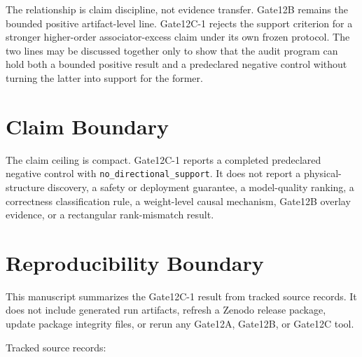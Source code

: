 \documentclass[11pt]{article}
\newcommand{\breakcode}[1]{\begingroup\urlstyle{tt}\nolinkurl{#1}\endgroup}
\begin{document}
The relationship is claim discipline, not evidence transfer. Gate12B remains
the bounded positive artifact-level line. Gate12C-1 rejects the support
criterion for a stronger higher-order associator-excess claim under its own
frozen protocol. The two lines may be discussed together only to show that the
audit program can hold both a bounded positive result and a predeclared
negative control without turning the latter into support for the former.

\section{Claim Boundary}
\label{sec:claim-boundary}

The claim ceiling is compact. Gate12C-1 reports a completed predeclared
negative control with \breakcode{no_directional_support}. It does not report a
physical-structure discovery, a safety or deployment guarantee, a model-quality
ranking, a correctness classification rule, a weight-level causal mechanism,
Gate12B overlay evidence, or a rectangular rank-mismatch result.

\section{Reproducibility Boundary}
\label{sec:reproducibility}

This manuscript summarizes the Gate12C-1 result from tracked source records. It
does not include generated run artifacts, refresh a Zenodo release package,
update package integrity files, or rerun any Gate12A, Gate12B, or Gate12C tool.

Tracked source records:
\end{document}
